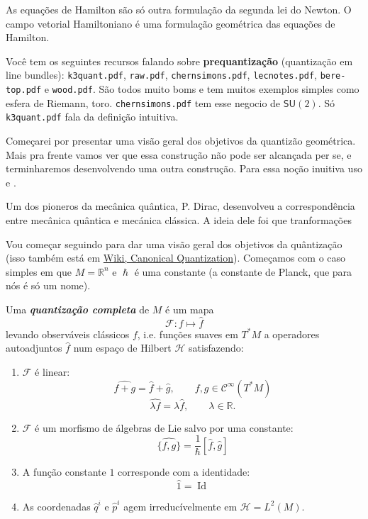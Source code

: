As equa\c c\~oes de Hamilton s\~ao s\'o outra formula\c c\~ao da segunda lei do Newton. O campo vetorial Hamiltoniano \'e uma formula\c c\~ao geom\'etrica das equa\c c\~oes de Hamilton.

\iffalse
{\color{3}Você tem os seguintes recursos falando sobre \textbf{prequantização}  (quantização em line bundles): \texttt{k3quant.pdf}, \texttt{raw.pdf}, \texttt{chernsimons.pdf}, \texttt{lecnotes.pdf},  \texttt{bere-top.pdf} e \texttt{wood.pdf}. São todos muito boms e tem muitos exemplos simples como esfera de Riemann, toro. \texttt{chernsimons.pdf} tem esse negocio de $\mathsf{SU}(2)$. Só \texttt{k3quant.pdf} fala da definição intuitiva.}

Começarei por presentar uma visão geral dos objetivos da quantizão geométrica. Mais pra frente vamos ver que essa construção não pode ser alcançada per se, e terminharemos desenvolvendo uma outra construção. Para essa noção inuitiva uso \cite{gq} e \cite{k3quant}.

Um dos pioneros da mecânica quântica, P. Dirac, desenvolveu a correspondência entre mecânica quântica e mecánica clássica. A ideia dele foi que tranformações 

Vou começar seguindo \cite{k3quant} para dar uma visão geral dos objetivos da quântização (isso também está em \href{https://en.wikipedia.org/wiki/Canonical_quantization#Classical_and_quantum_brackets}{Wiki, Canonical Quantization}). Começamos com o caso simples em que $M=\mathbb{R}^{n}$ e $\hslash$ é uma constante (a constante de Planck, que para nós é só um nome).

\begin{defn}\leavevmode
	Uma \textit{\textbf{quantização completa}} de $M$ é um mapa
	\[\mathcal{F}:f\longmapsto \hat{f}\]
	levando observáveis clássicos $f $, i.e. funções suaves em $T^*M$ a operadores autoadjuntos $\hat{f}$ num espaço de Hilbert $\mathcal{H}$ satisfazendo:
	\begin{enumerate}
		\item $\mathcal{F}$ é linear:
			\[\widehat{f+g}=\hat{f}+\hat{g},\qquad f,g\in\mathcal{C}^\infty(T^*M)\]
			\[\widehat{\lambda f}=\lambda\hat{f},\qquad \lambda\in\mathbb{R}.\]
	
		\item $ \mathcal{F}$ é um morfismo de álgebras de Lie salvo por uma constante:
			\[\widehat{\{f,g\}}=\frac{1}{\hslash}\left[\hat{f},\hat{g}\right]\]
\item A função constante $1$ corresponde com a identidade:
	\[\hat{1}=\operatorname{Id}\]

	\item As coordenadas $\hat{q}^i$ e $\hat{p}^i$ agem irreducívelmente em $\mathcal{H}=L^2(M)$.
	\end{enumerate}
\end{defn}

